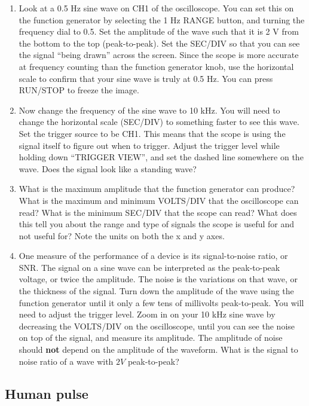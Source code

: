 \begin{enumerate}
\item Look at a 0.5 Hz sine wave on CH1 of the oscilloscope. You can set this on the function generator by selecting the 1 Hz RANGE button, and turning the frequency dial to 0.5. Set the amplitude of the wave such that it is 2 V from the bottom to the top (peak-to-peak). Set the SEC/DIV so that you can see the signal ``being drawn'' across the screen. Since the scope is more accurate at frequency counting than the function generator knob, use the horizontal scale to confirm that your sine wave is truly at 0.5 Hz. You can press RUN/STOP to freeze the image.

\item Now change the frequency of the sine wave to 10 kHz. You will need to change the horizontal scale (SEC/DIV) to something faster to see this wave. Set the trigger source to be CH1. This means that the scope is using the signal itself to figure out when to trigger. Adjust the trigger level while holding down ``TRIGGER VIEW'', and set the dashed line somewhere on the wave. Does the signal look like a standing wave?

\item What is the maximum amplitude that the function generator can produce? What is the maximum and minimum VOLTS/DIV that the oscilloscope can read? What is the minimum SEC/DIV that the scope can read? What does this tell you about the range and type of signals the scope is useful for and not useful for? Note the units on both the x and y axes.

\item One measure of the performance of a device is its signal-to-noise ratio, or SNR. The signal on a sine wave can be interpreted as the peak-to-peak voltage, or twice the amplitude. The noise is the variations on that wave, or the thickness of the signal. Turn down the amplitude of the wave using the function generator until it only a few tens of millivolts peak-to-peak. You will need to adjust the trigger level. Zoom in on your 10 kHz sine wave by decreasing the VOLTS/DIV on the oscilloscope, until you can see the noise on top of the signal, and measure its amplitude. The amplitude of noise should {\bf{not}} depend on the amplitude of the waveform. What is the signal to noise ratio of a wave with $2V$ peak-to-peak?

\end{enumerate}

\subsection{Human pulse}

